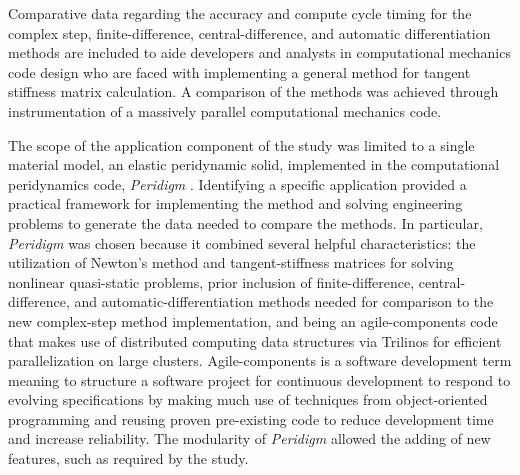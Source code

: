 \documentclass[preprint,12pt]{elsarticle}
\begin{document}
Comparative data regarding the accuracy and compute cycle timing for the
complex step, finite-difference, central-difference, and automatic
differentiation methods are included to aide developers and analysts in
computational mechanics code design who are faced with implementing a general
method for tangent stiffness matrix calculation.  A comparison of the methods was achieved through instrumentation of a
massively parallel computational mechanics code. 

The scope of the application component of the study was limited to a single
material model, an elastic peridynamic solid, implemented in the computational
peridynamics code, \textit{Peridigm} \cite{peridigm}. Identifying a specific
application provided a practical framework for implementing the
 method and solving engineering
problems to generate the data needed to compare the methods. In particular,
\emph{Peridigm} was chosen because it combined several helpful
characteristics: the utilization of Newton's method and tangent-stiffness
matrices for solving nonlinear quasi-static problems, prior inclusion of
finite-difference, central-difference, and automatic-differentiation
methods needed for comparison to the new complex-step method
implementation, and being an agile-components code that makes use of
distributed computing data structures via Trilinos \cite{trilinos} for
efficient parallelization on large clusters. Agile-components is a software
development term meaning to structure a software project for continuous
development to respond to evolving specifications by making much use of
techniques from object-oriented programming and reusing proven pre-existing
code to reduce development time and increase reliability. The modularity of
\emph{Peridigm} allowed the adding of new features, such as required by the
study.
\end{document}
